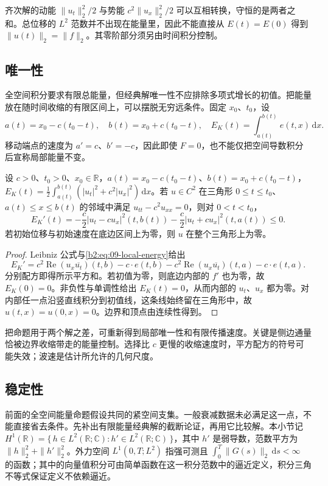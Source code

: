 齐次解的动能 \(\|u_t\|_2^2/2\) 与势能 \(c^2\|u_x\|_2^2/2\) 可以互相转换，守恒的是两者之和。总位移的 \(L^2\) 范数并不出现在能量里，因此不能直接从 \(E(t)=E(0)\) 得到 \(\|u(t)\|_2=\|f\|_2\)。其零阶部分须另由时间积分控制。

\subsection{唯一性}
\label{b2:subsec:090302}

全空间积分要求有限总能量，但经典解唯一性不应排除多项式增长的初值。把能量放在随时间收缩的有限区间上，可以摆脱无穷远条件。固定 \(x_0\)、\(t_0\)，设
\[
 a(t)=x_0-c(t_0-t),\quad b(t)=x_0+c(t_0-t),\quad
 E_K(t)=\int_{a(t)}^{b(t)}e(t,x)\,\mathrm{d}x.
\]
移动端点的速度为 \(a'=c\)、\(b'=-c\)，因此即使 \(F=0\)，也不能仅把空间导数积分后宣称局部能量不变。

\begin{proposition}[收缩区间的能量]\label{b2:prop:09-cone-energy}
设 \(c>0\)、\(t_0>0\)、\(x_0\in\mathbb R\)，\(a(t)=x_0-c(t_0-t)\)、\(b(t)=x_0+c(t_0-t)\)，\(E_K(t)=\frac12\int_{a(t)}^{b(t)}(|u_t|^2+c^2|u_x|^2)\,\mathrm dx\)。若 \(u\in C^2\) 在三角形 \(0\leq t\leq t_0\)、\(a(t)\leq x\leq b(t)\) 的邻域中满足 \(u_{tt}-c^2u_{xx}=0\)，则对 \(0<t<t_0\)，
\[
 E_K'(t)=-\dfrac c2|u_t-cu_x|^2(t,b(t))
             -\dfrac c2|u_t+cu_x|^2(t,a(t))\leq0.
\]
若初始位移与初始速度在底边区间上为零，则 \(u\) 在整个三角形上为零。
\end{proposition}
\begin{proof}
Leibniz 公式与\eqref{b2:eq:09-local-energy}给出
\[
 E_K'=c^2\operatorname{Re}(u_x\overline{u_t})(t,b)-c\cdot e(t,b)
       -c^2\operatorname{Re}(u_x\overline{u_t})(t,a)-c\cdot e(t,a).
\]
分别配方即得所示平方和。若初值为零，则底边内部的 \(f'\) 也为零，故 \(E_K(0)=0\)。非负性与单调性给出 \(E_K(t)=0\)，从而内部的 \(u_t\)、\(u_x\) 都为零。对内部任一点沿竖直线积分到初值线，这条线始终留在三角形中，故 \(u(t,x)=u(0,x)=0\)。边界和顶点由连续性得到。
\end{proof}

把命题用于两个解之差，可重新得到局部唯一性和有限传播速度。关键是侧边通量恰被边界收缩带走的能量控制。选择比 \(c\) 更慢的收缩速度时，平方配方的符号可能失效；波速是估计所允许的几何尺度。

\subsection{稳定性}
\label{b2:subsec:090303}

前面的全空间能量命题假设共同的紧空间支集。一般衰减数据未必满足这一点，不能直接省去条件。先补出有限能量经典解的截断论证，再用它比较解。本小节记 \(H^1(\mathbb R)=\{\,h\in L^2(\mathbb R;\mathbb C):h'\in L^2(\mathbb R;\mathbb C)\,\}\)，其中 \(h'\) 是弱导数，范数平方为 \(\|h\|_2^2+\|h'\|_2^2\)。外力空间 \(L^1(0,T;L^2)\) 指强可测且 \(\int_0^T\|G(s)\|_2\,\mathrm{d}s<\infty\) 的函数；其中的向量值积分可由简单函数在这一积分范数中的逼近定义，积分三角不等式保证定义不依赖逼近。

